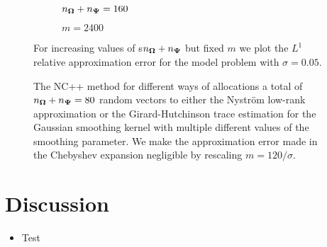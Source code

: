 \documentclass[12pt]{article}
\begin{document}
\begin{figure}[ht]
    \begin{subfigure}[b]{0.49\columnwidth}
        
        \caption{$n_{\boldsymbol{\Omega}} + n_{\boldsymbol{\Psi}} = 160$}
        \label{convergence-randvec}
    \end{subfigure}
    \begin{subfigure}[b]{0.49\columnwidth}
        
        \caption{$m = 2400$}
        \label{fig:convergence-degree}
    \end{subfigure}
    \caption{For increasing values of s$n_{\boldsymbol{\Omega}} + n_{\boldsymbol{\Psi}}$ but fixed $m$ we plot the $L^1$ relative approximation error for the model problem with $\sigma=0.05$.}
    \label{fig:convergence}
\end{figure}


\begin{figure}[ht]
    \centering
    
    \caption{The NC++ method for different ways of allocations a 
    total of $n_{\boldsymbol{\Omega}} + n_{\boldsymbol{\Psi}}=80$ random vectors
    to either the Nystr\"om low-rank approximation or the Girard-Hutchinson trace estimation
    for the Gaussian smoothing kernel with multiple different values of
    the smoothing parameter. We make the approximation error made in the
    Chebyshev expansion negligible by rescaling $m=120 / \sigma$.}
    \label{fig:matvec-mix}
\end{figure}


\section{Discussion}
\label{sec:discussion}

\begin{itemize}
    \item Test
\end{itemize}

\clearpage



\end{document}
